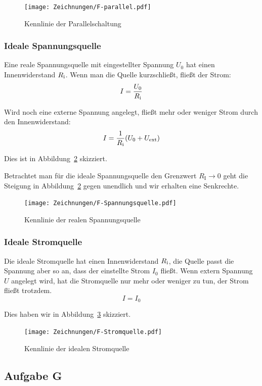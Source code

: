 \begin{figure}[htbp]
	\centering
	\caption{%
		Kennlinie der Parallelschaltung
	}
	\label{fig:F-parallel}
	\texttt{[image: Zeichnungen/F-parallel.pdf]}
\end{figure}

\FloatBarrier
\subsubsection{Ideale Spannungsquelle}

Eine reale Spannungsquelle mit eingestellter Spannung $U_0$ hat einen
Innenwiderstand $R_\text i$. Wenn man die Quelle kurzschließt, fließt der
Strom:
\[
	I = \frac{U_0}{R_\text i}
\]

Wird noch eine externe Spannung angelegt, fließt mehr oder weniger Strom durch
den Innenwiderstand:
\[
	I = \frac{1}{R_\text i} (U_0 + U_\text{ext})
\]

Dies ist in Abbildung~\ref{fig:F-Spannungsquelle} skizziert.

Betrachtet man für die ideale Spannungsquelle den Grenzwert $R_\text{I}\to0$
geht die Steigung in Abbildung~\ref{fig:F-Spannungsquelle} gegen unendlich und
wir erhalten eine Senkrechte.

\begin{figure}[htbp]
	\centering
	\caption{%
		Kennlinie der realen Spannungsquelle
	}
	\label{fig:F-Spannungsquelle}
	\texttt{[image: Zeichnungen/F-Spannungsquelle.pdf]}
\end{figure}

\FloatBarrier
\subsubsection{Ideale Stromquelle}

Die ideale Stromquelle hat einen Innenwiderstand $R_\text i$, die Quelle passt
die Spannung aber so an, dass der einstellte Strom $I_0$ fließt. Wenn extern
Spannung $U$ angelegt wird, hat die Stromquelle nur mehr oder weniger zu tun,
der Strom fließt trotzdem.
\[
	I = I_0
\]

Dies haben wir in Abbildung~\ref{fig:F-Stromquelle} skizziert.

\begin{figure}[htbp]
	\centering
	\caption{%
		Kennlinie der idealen Stromquelle
	}
	\label{fig:F-Stromquelle}
	\texttt{[image: Zeichnungen/F-Stromquelle.pdf]}
\end{figure}

\FloatBarrier
\subsection{Aufgabe G}

